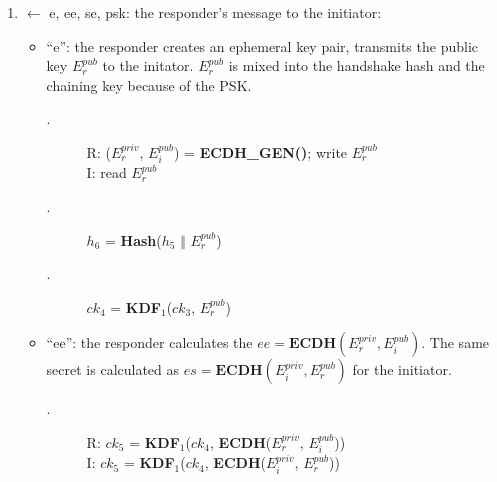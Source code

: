   \begin{enumerate} [start = \value{msg}]
    \item $\leftarrow$ e, ee, se, psk: the responder's message to the initiator:
    \addtocounter{msg}{1}
    \begin{itemize}
      \item ``e'': the responder creates an ephemeral key pair, transmits the public key
      $E^{pub}_r$ to the initator. $E^{pub}_r$ is mixed into the handshake hash and the chaining
      key because of the PSK.
      \begin{center}
        \begin{varwidth}{\textwidth}
          \begin{description}
          \item[\textnormal{}.] R: ($E^{priv}_r$, $E^{pub}_i$) = \textbf{ECDH{\_}GEN()}; write $E^{pub}_r$ \\
                I:  read $E^{pub}_r$
          \addtocounter{cnt}{1}
          \item[\textnormal{}.] $h_6$ = \textbf{Hash}($h_5$ $\Vert$ $E^{pub}_r$)
          \addtocounter{cnt}{1}
          \item[\textnormal{}.] $ck_4$ = \textbf{KDF}$_1$($ck_3$, $E^{pub}_r$)
          \addtocounter{cnt}{1}
          \end{description}
        \end{varwidth}
      \end{center}
    \item ``ee'':  the responder calculates the $ee = \textbf{ECDH}(E^{priv}_r, E^{pub}_i)$. The
    same secret is calculated as $es = \textbf{ECDH}(E^{priv}_i, E^{pub}_r)$ for the initiator.
      \begin{center}
        \begin{varwidth}{\textwidth}
          \begin{description}
          \item[\textnormal{}.] 
                R: $ck_5$ = \textbf{KDF}$_1$($ck_4$, \textbf{ECDH}($E^{priv}_r$, $E^{pub}_i$)) \\
                I: $ck_5$ = \textbf{KDF}$_1$($ck_4$, \textbf{ECDH}($E^{priv}_i$, $E^{pub}_r$))
          \addtocounter{cnt}{1}
          \end{description}
        \end{varwidth}
      \end{center}


\end{itemize}
\end{enumerate}

